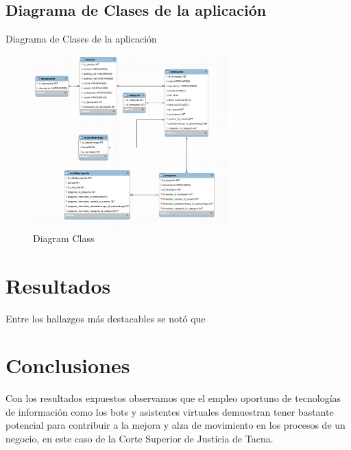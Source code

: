 \documentclass[twoside,twocolumn]{article}
\begin{document}
\subsection{Diagrama de Clases de la aplicación}
Diagrama de Clases de la aplicación
\begin{figure}[h!]
	\begin{center}
		\includegraphics[width=7.5cm]{./Imagenes/diagramclass} 
		\caption{Diagram Class}
	\end{center}
\end{figure}

\section{Resultados}

Entre los hallazgos más destacables se notó que 

\section{Conclusiones}

Con los resultados expuestos observamos que el empleo oportuno de tecnologías de información como los bots y asistentes virtuales demuestran tener bastante potencial para contribuir a la mejora y alza de movimiento en los procesos de un negocio, en este caso de la Corte Superior de Justicia de Tacna.
\end{document}

